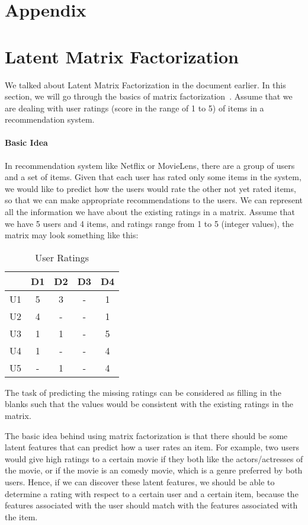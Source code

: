 \newpage
\appendix
\section*{Appendix}
\section{Latent Matrix Factorization}
 We talked about Latent Matrix Factorization in the document earlier. In this section, we will go through the basics of matrix factorization~\cite{model_ref3}. Assume that we are dealing with user ratings (score in the range of 1 to 5) of items in a recommendation system.

\paragraph{Basic Idea}
 In recommendation system like Netflix or MovieLens, there are a group of users and a set of items. Given that each user has rated only some items in the system, we would like to predict how the users would rate the other not yet rated items, so that we can make appropriate recommendations to the users. We can represent all the information we have about the existing ratings in a matrix. Assume that we have 5 users and 4 items, and ratings range from 1 to 5 (integer values), the matrix may look something like this:

\begin{table}[ht]
\caption{User Ratings}
\centering %
\begin{tabular}{c c c c c}
\hline\hline %
& D1 & D2 & D3 & D4 \\ [0.5ex] %
\hline %
U1 & 5 & 3 & - & 1\\ %
U2 & 4 & - & - & 1\\
U3 & 1 & 1 & - & 5\\
U4 & 1 & - & - & 4\\
U5 & - & 1 & - & 4\\ [1ex] %
\hline %
\end{tabular}
\end{table}

 The task of predicting the missing ratings can be considered as filling in the blanks such that the values would be consistent with the existing ratings in the matrix.
 
 The basic idea behind using matrix factorization is that there should be some latent features that can predict how a user rates an item. For example, two users would give high ratings to a certain movie if they both like the actors/actresses of the movie, or if the movie is an comedy movie, which is a genre preferred by both users. Hence, if we can discover these latent features, we should be able to determine a rating with respect to a certain user and a certain item, because the features associated with the user should match with the features associated with the item.

